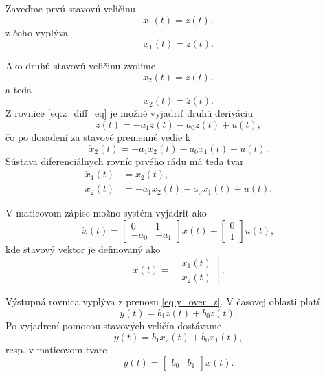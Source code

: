 Zaveďme prvú stavovú veličinu
\begin{equation}
	x_1(t) = z(t),
\end{equation}
z čoho vyplýva
\begin{equation}
	\dot{x}_1(t) = \dot{z}(t).
\end{equation}

Ako druhú stavovú veličinu zvolíme
\begin{equation}
	x_2(t) = \dot{z}(t),
\end{equation}
a teda
\begin{equation}
	\dot{x}_2(t) = \ddot{z}(t).
\end{equation}
Z rovnice \eqref{eq:z_diff_eq} je možné vyjadriť druhú deriváciu
\begin{equation}
	\ddot{z}(t)
	=
	- a_1 \dot{z}(t)
	- a_0 z(t)
	+ u(t),
\end{equation}
čo po dosadení za stavové premenné vedie k
\begin{equation}
	\dot{x}_2(t)
	=
	- a_1 x_2(t)
	- a_0 x_1(t)
	+ u(t).
\end{equation}
Sústava diferenciálnych rovníc prvého rádu má teda tvar
\begin{align}
	\dot{x}_1(t) &= x_2(t),
	\\
	\dot{x}_2(t) &= - a_1 x_2(t) - a_0 x_1(t) + u(t).
\end{align}

V maticovom zápise možno systém vyjadriť ako
\begin{equation}
	\dot{x}(t)
	=
	\begin{bmatrix}
		0 & 1 \\
		- a_0 & - a_1
	\end{bmatrix}
	x(t)
	+
	\begin{bmatrix}
		0 \\
		1
	\end{bmatrix}
	u(t),
	\label{eq:state_matrix_form}
\end{equation}
kde stavový vektor je definovaný ako
\begin{equation}
	x(t)
	=
	\begin{bmatrix}
		x_1(t) \\
		x_2(t)
	\end{bmatrix}.
\end{equation}

Výstupná rovnica vyplýva z prenosu \eqref{eq:y_over_z}.
V časovej oblasti platí
\begin{equation}
	y(t)
	=
	b_1 \dot{z}(t)
	+
	b_0 z(t).
\end{equation}
Po vyjadrení pomocou stavových veličín dostávame
\begin{equation}
	y(t)
	=
	b_1 x_2(t)
	+
	b_0 x_1(t),
\end{equation}
resp. v maticovom tvare
\begin{equation}
	y(t)
	=
	\begin{bmatrix}
		b_0 & b_1
	\end{bmatrix}
	x(t).
\end{equation}


